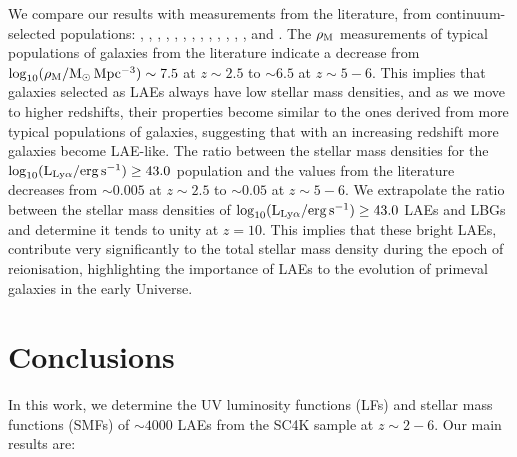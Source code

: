 \documentclass[a4paper,fleqn,usenatbib]{mnras}
\begin{document}
We compare our results with measurements from the literature, from continuum-selected populations: \cite{Davidzon2017}, \cite{Caputi2011}, \cite{Caputi2015}, \citealt{Duncan2014}, \cite{Gonzalez2011}, \cite{Grazian2015}, \cite{Ilbert2013}, \cite{Mortlock2011}, \cite{Mortlock2015}, \cite{Muzzin2013}, \cite{Reddy2012}, \cite{Santini2012}, \cite{Song2016}, and \cite{Tomczak2014}. The $\rho_{\rm M}$ measurements of typical populations of galaxies from the literature indicate a decrease from $\log_{10}(\rm\rho_{M}/M_\odot\,Mpc^{-3})\sim7.5$ at $z\sim2.5$ to $\sim6.5$ at $z\sim5-6$. This implies that galaxies selected as LAEs always have low stellar mass densities, and as we move to higher redshifts, their properties become similar to the ones derived from more typical populations of galaxies, suggesting that with an increasing redshift more galaxies become LAE-like. The ratio between the stellar mass densities for the $\log_{10} (\rm L_{Ly\alpha}/erg\,s^{-1}) \geq 43.0$ population and the values from the literature decreases from $\sim0.005$ at $z\sim2.5$ to $\sim0.05$ at $z\sim5-6$. We extrapolate the ratio between the stellar mass densities of $\log_{10} (\rm L_{Ly\alpha}/erg\,s^{-1}) \geq 43.0$ LAEs and LBGs and determine it tends to unity at $z=10$. This implies that these bright LAEs, contribute very significantly to the total stellar mass density during the epoch of reionisation, highlighting the importance of LAEs to the evolution of primeval galaxies in the early Universe. 


\section{Conclusions} \label{sec:conclusions}

In this work, we determine the UV luminosity functions (LFs) and stellar mass functions (SMFs) of $\sim4000$ LAEs from the SC4K sample at $z\sim2-6$. Our main results are:
\end{document}
